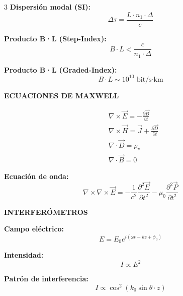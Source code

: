 \documentclass[10pt,a4paper,landscape]{article}
\newcommand{\secbox}[1]{\colorbox{blue!20}{\textbf{#1}}}
\begin{document}
\begin{multicols}{3}
\textbf{Dispersión modal (SI):}
\begin{equation*}
\boxed{\Delta\tau = \frac{L \cdot n_1 \cdot \Delta}{c}}
\end{equation*}

\textbf{Producto B·L (Step-Index):}
\begin{equation*}
\boxed{B \cdot L < \frac{c}{n_1 \cdot \Delta}}
\end{equation*}

\textbf{Producto B·L (Graded-Index):}
\begin{equation*}
\boxed{B \cdot L \sim 10^{10} \text{ bit/s·km}}
\end{equation*}

\secbox{ECUACIONES DE MAXWELL}

\begin{align*}
&\boxed{\nabla \times \vec{E} = -\frac{\partial \vec{B}}{\partial t}}\\
&\boxed{\nabla \times \vec{H} = \vec{J} + \frac{\partial \vec{D}}{\partial t}}\\
&\boxed{\nabla \cdot \vec{D} = \rho_v}\\
&\boxed{\nabla \cdot \vec{B} = 0}
\end{align*}

\textbf{Ecuación de onda:}
\begin{equation*}
\boxed{\nabla \times \nabla \times \vec{E} = -\frac{1}{c^2}\frac{\partial^2 \vec{E}}{\partial t^2} - \mu_0 \frac{\partial^2 \vec{P}}{\partial t^2}}
\end{equation*}

\secbox{INTERFERÓMETROS}

\textbf{Campo eléctrico:}
\begin{equation*}
\boxed{E = E_0 e^{i(\omega t - kz + \phi_0)}}
\end{equation*}

\textbf{Intensidad:}
\begin{equation*}
\boxed{I \propto E^2}
\end{equation*}

\textbf{Patrón de interferencia:}
\begin{equation*}
\boxed{I \propto \cos^2(k_0 \sin\theta \cdot z)}
\end{equation*}


\end{multicols}
\end{document}
